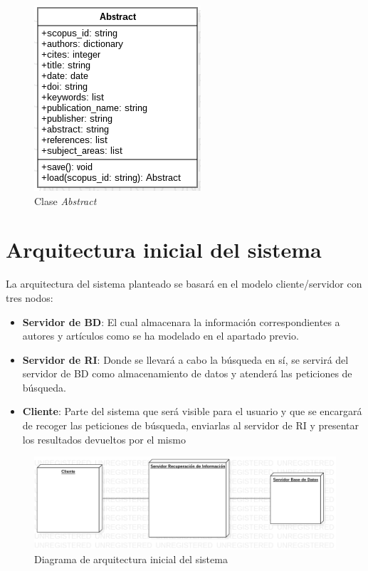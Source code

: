 \begin{figure}[h]
	
	\centering
	\includegraphics[width=0.4\linewidth]{imagenes/Abstract}
	\caption{Clase \textit{Abstract}}
\end{figure}

\newpage

\section{Arquitectura inicial del sistema}
\label{sc:arq_inicial}
La arquitectura del sistema planteado se basará en el modelo cliente/servidor con tres nodos:
\begin{itemize}
	\item \textbf{Servidor de \acrlong{BD}}: El cual almacenara la información correspondientes a autores y artículos como se ha modelado en el apartado previo.
	\item \textbf{Servidor de \acrshort{RI}}: Donde se llevará a cabo la búsqueda en sí, se servirá del servidor de \acrshort{BD} como almacenamiento de datos y atenderá las peticiones de búsqueda.
	\item \textbf{Cliente}: Parte del sistema que será visible para el usuario y que se encargará de recoger las peticiones de búsqueda, enviarlas al servidor de \acrshort{RI} y presentar los resultados devueltos por el mismo
\end{itemize}

\begin{figure}[ht]
	
	\centering
	\includegraphics[width=\linewidth]{imagenes/initial_architecture}
	\caption{Diagrama de arquitectura inicial del sistema}

\end{figure}